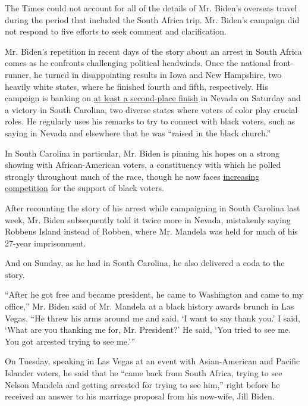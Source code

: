 The Times could not account for all of the details of Mr. Biden's
overseas travel during the period that included the South Africa trip.
Mr. Biden's campaign did not respond to five efforts to seek comment and
clarification.

Mr. Biden's repetition in recent days of the story about an arrest in
South Africa comes as he confronts challenging political headwinds. Once
the national front-runner, he turned in disappointing results in Iowa
and New Hampshire, two heavily white states, where he finished fourth
and fifth, respectively. His campaign is banking on
\href{https://www.nytimes3xbfgragh.onion/2020/02/17/us/politics/joe-biden-nevada.html}{at
least a second-place finish} in Nevada on Saturday and a victory in
South Carolina, two diverse states where voters of color play crucial
roles. He regularly uses his remarks to try to connect with black
voters, such as saying in Nevada and elsewhere that he was ``raised in
the black church.''

In South Carolina in particular, Mr. Biden is pinning his hopes on a
strong showing with African-American voters, a constituency with which
he polled strongly throughout much of the race, though he now faces
\href{https://www.nytimes3xbfgragh.onion/2020/02/13/us/politics/biden-black-voters-south-carolina.html}{increasing
competition} for the support of black voters.

After recounting the story of his arrest while campaigning in South
Carolina last week, Mr. Biden subsequently told it twice more in Nevada,
mistakenly saying Robbens Island instead of Robben, where Mr. Mandela
was held for much of his 27-year imprisonment.

And on Sunday, as he had in South Carolina, he also delivered a coda to
the story.

``After he got free and became president, he came to Washington and came
to my office,'' Mr. Biden said of Mr. Mandela at a black history awards
brunch in Las Vegas. ``He threw his arms around me and said, `I want to
say thank you.' I said, `What are you thanking me for, Mr. President?'
He said, `You tried to see me. You got arrested trying to see me.'''

On Tuesday, speaking in Las Vegas at an event with Asian-American and
Pacific Islander voters, he said that he ``came back from South Africa,
trying to see Nelson Mandela and getting arrested for trying to see
him,'' right before he received an answer to his marriage proposal from
his now-wife, Jill Biden.

